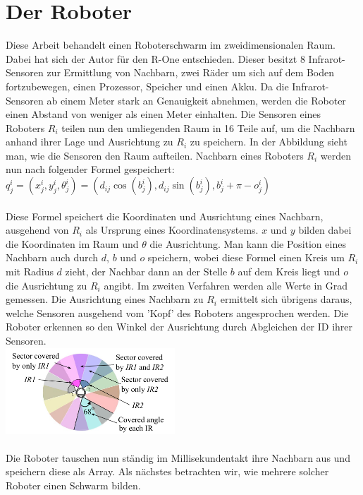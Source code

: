 \section{Der Roboter}

Diese Arbeit behandelt einen Roboterschwarm im zweidimensionalen Raum. Dabei hat sich der Autor für den 
R-One entschieden. Dieser besitzt 8 Infrarot-Sensoren zur Ermittlung von Nachbarn, zwei Räder um sich
auf dem Boden fortzubewegen, einen Prozessor, Speicher und einen Akku. Da die Infrarot-Sensoren ab einem
Meter stark an Genauigkeit abnehmen, werden die Roboter einen Abstand von weniger als einen Meter einhalten.
Die Sensoren eines Roboters $R_i$ teilen nun den umliegenden Raum in 16 Teile auf, um die Nachbarn anhand 
ihrer Lage und Ausrichtung zu $R_i$ zu speichern. In der Abbildung sieht man, wie die Sensoren den Raum
aufteilen. Nachbarn eines Roboters $R_i$ werden nun nach folgender Formel gespeichert:\\

$q_j^i=(x_j^i,y_j^i,\theta_j^i)=(d_{ij}\cos(b_j^i),d_{ij}\sin(b_j^i),b_j^i+\pi-o_j^i)$\\\\
Diese Formel speichert die Koordinaten und Ausrichtung eines Nachbarn, ausgehend von $R_i$ als Ursprung
eines Koordinatensystems. $x$ und $y$ bilden dabei die Koordinaten im Raum und $\theta$ die Ausrichtung.
Man kann die Position eines Nachbarn auch durch $d$, $b$ und $o$ speichern, wobei diese Formel einen Kreis
um $R_i$ mit Radius $d$ zieht, der Nachbar dann an der Stelle $b$ auf dem Kreis liegt und $o$ die
Ausrichtung zu $R_i$ angibt. Im zweiten Verfahren werden alle Werte in Grad gemessen. Die Ausrichtung eines
Nachbarn zu $R_i$ ermittelt sich übrigens daraus, welche Sensoren ausgehend vom 'Kopf' des Roboters
angesprochen werden. Die Roboter erkennen so den Winkel der Ausrichtung durch Abgleichen der ID ihrer
Sensoren.\\

\includegraphics[width=2.5in]{images/Screenshot 2023-02-16 at 11.53.03 AM.png}\\\\
Die Roboter tauschen nun ständig im Millisekundentakt ihre Nachbarn aus und speichern diese als Array.
Als nächstes betrachten wir, wie mehrere solcher Roboter einen Schwarm bilden.